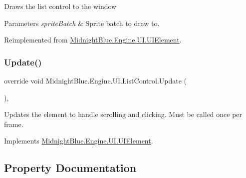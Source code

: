 Draws the list control to the window 


\begin{DoxyParams}{Parameters}
{\em sprite\+Batch} & Sprite batch to draw to.\\
\hline
\end{DoxyParams}


Reimplemented from \hyperlink{class_midnight_blue_1_1_engine_1_1_u_i_1_1_u_i_element_a0faa27f642478cd428c4718f66263325}{Midnight\+Blue.\+Engine.\+U\+I.\+U\+I\+Element}.

\hypertarget{class_midnight_blue_1_1_engine_1_1_u_i_1_1_list_control_a062289ffbf721905fb4f8aabadbef5fc}{}\label{class_midnight_blue_1_1_engine_1_1_u_i_1_1_list_control_a062289ffbf721905fb4f8aabadbef5fc} 
\subsubsection{\texorpdfstring{Update()}{Update()}}
{\footnotesize\ttfamily override void Midnight\+Blue.\+Engine.\+U\+I.\+List\+Control.\+Update (\begin{DoxyParamCaption}{ }\end{DoxyParamCaption})\hspace{0.3cm}{\ttfamily [inline]}, {\ttfamily [virtual]}}



Updates the element to handle scrolling and clicking. Must be called once per frame. 



Implements \hyperlink{class_midnight_blue_1_1_engine_1_1_u_i_1_1_u_i_element_a5b2bff6eed644fc33bc3e1ffaa8bfc70}{Midnight\+Blue.\+Engine.\+U\+I.\+U\+I\+Element}.



\subsection{Property Documentation}
\hypertarget{class_midnight_blue_1_1_engine_1_1_u_i_1_1_list_control_ab54c707895599c425bf9e9ffd89994d8}{}\label{class_midnight_blue_1_1_engine_1_1_u_i_1_1_list_control_ab54c707895599c425bf9e9ffd89994d8} 

